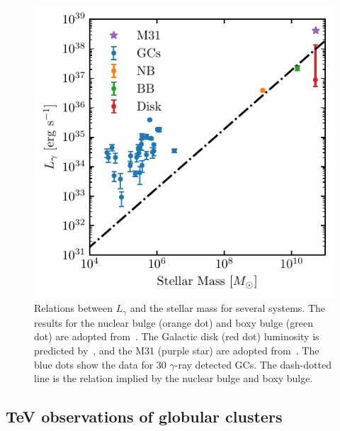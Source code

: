 \documentclass[doublespace,nopageskip]{VTthesis} %
\begin{document}
\begin{figure}
    \centering
    \includegraphics[width=1\columnwidth]{Figures/Globular/mass.pdf}
    \caption{Relations between $L_\gamma$ and the stellar mass for several systems. The results for the nuclear bulge (orange dot) and boxy bulge (green dot) are adopted from~\citet{2019JCAP...09..042M}. The Galactic disk (red dot) luminosity is predicted by~\citet{2018NatAs...2..819B}, and the M31 (purple star) are adopted from~\citet{2017ApJ...836..208A}. The blue dots show the data for 30 $\gamma$-ray detected GCs. The dash-dotted line is the relation implied by the nuclear bulge and boxy bulge.}
    \label{fig:stellar_mass}
\end{figure}

\subsection{TeV observations of globular clusters}
\end{document}
